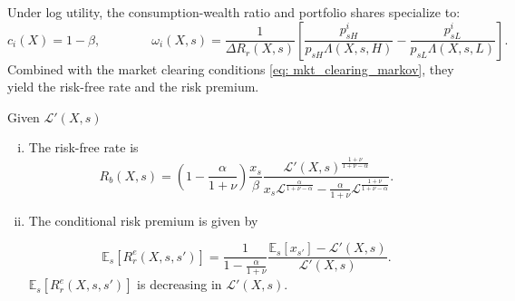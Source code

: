 Under log utility, the consumption-wealth ratio and portfolio shares specialize to:
\begin{equation}\nonumber
    c_i(X) = 1-\beta, \qquad \qquad 
    \omega_{i}(X,s) = \frac{1}{\Delta R_r(X,s)} \left[\frac{p_{sH}^i}{p_{sH}\Lambda(X,s,H)}  -\frac{p_{sL}^i}{p_{sL}\Lambda(X,s,L)} \right].
\end{equation}
Combined with the market clearing conditions \eqref{eq: mkt_clearing_markov}, they yield the risk-free rate and the risk premium. 
\begin{proposition} \label{prop: asset_prices} Given $\mathcal{L}'(X,s)$
\begin{enumerate}[(i)]
    \item The risk-free rate is 
    \begin{equation}
        R_{b}(X,s) = \left(1 - \frac{\alpha}{1+\nu}\right)\frac{x_s}{\beta} \frac{ \mathcal{L}'(X,s)^{\frac{1+\nu}{1+\nu-\alpha}}}{x_{s} \mathcal{L}^\frac{\alpha}{1+\nu-\alpha} - \frac{\alpha}{1+\nu} \mathcal{L}^{\frac{1+\nu}{1+\nu-\alpha}} }.
    \end{equation}
    \item The conditional risk premium is given by
    
    \begin{equation}\label{eq: risk_premium}
    \mathbb{E}_s[R_{r}^e(X,s,s')] = \frac{1}{1 - \frac{\alpha}{1+\nu}} \frac{\mathbb{E}_s[x_{s'}] - \mathcal{L}'(X,s)}{\mathcal{L}'(X,s)}.
\end{equation}
    $\mathbb{E}_s[R_{r}^e(X,s,s')]$ is decreasing in $\mathcal{L}'(X,s)$.
\end{enumerate}
\end{proposition}
